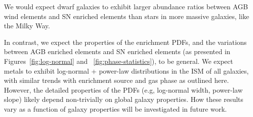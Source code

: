 \documentclass[twocolumn]{aastex61}
\begin{document}
We would expect dwarf galaxies to exhibit larger abundance ratios between AGB wind elements and SN enriched elements than stars in more massive galaxies, like the Milky Way.

In contrast, we expect the properties of the enrichment PDFs, and the variations between AGB enriched elements and SN enriched elements (as presented in Figures~\ref{fig:log-normal} and ~\ref{fig:phase-statistics}), to be general. We expect metals to exhibit log-normal + power-law distributions in the ISM of all galaxies, with similar trends with enrichment source and gas phase as outlined here. However, the detailed properties of the PDFs (e.g, log-normal width, power-law slope) likely depend non-trivially on global galaxy properties. How these results vary as a function of galaxy properties will be investigated in future work.


\end{document}
